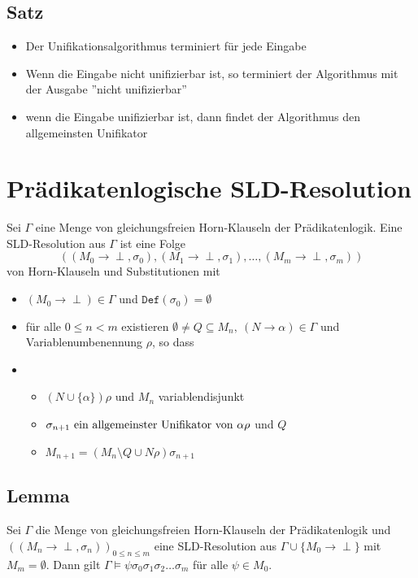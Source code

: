 \documentclass[12pt,a4paper]{report}
\newcommand{\ra}{\rightarrow}
\newcommand{\red}[1]{\textcolor[rgb]{0.9,0.2,0.2}{#1}}
\newcommand{\green}[1]{\textcolor[rgb]{0.1,0.6,0.1}{#1}}
\begin{document}
\subsection{\green{Satz}}
\begin{itemize}
    \item Der Unifikationsalgorithmus terminiert für jede Eingabe
    \item Wenn die Eingabe nicht unifizierbar ist, so terminiert der Algorithmus mit der Ausgabe ''nicht unifizierbar''
    \item wenn die Eingabe unifizierbar ist, dann findet der Algorithmus den allgemeinsten Unifikator
\end{itemize}

\section{\red{Prädikatenlogische SLD-Resolution}}
Sei $ \Gamma $ eine Menge von gleichungsfreien Horn-Klauseln der Prädikatenlogik. Eine \red{SLD-Resolution aus $ \Gamma $} ist eine Folge
\[
    ((M_0 \ra \perp, \sigma_0), (M_1 \ra \perp, \sigma_1),\dots, (M_m \ra \perp, \sigma_m))
\]
von Horn-Klauseln und Substitutionen mit
\begin{itemize}
    \item $ (M_0 \ra \perp) \in \Gamma $ und $ \texttt{Def}(\sigma_0) = \emptyset $
    \item für alle $ 0 \leq n < m $ existieren $ \emptyset \neq Q \subseteq M_n,~ (N \ra \alpha) \in \Gamma $ und Variablenumbenennung $ \rho $, so dass
    \item \begin{itemize}
        \item $ (N \cup \{\alpha\}) \rho $ und $ M_n $ variablendisjunkt
        \item $ \sigma_{n+1} \textnormal{ ein allgemeinster Unifikator von } \alpha \rho $ und $ Q $
        \item $ M_{n+1} = (M_n \setminus Q \cup N \rho) \sigma_{n+1} $
    \end{itemize}
\end{itemize}
\subsection{\green{Lemma}}
Sei $ \Gamma $ die Menge von gleichungsfreien Horn-Klauseln der Prädikatenlogik und $ ((M_n \ra \perp, \sigma_n))_{0 \leq n \leq m} $ eine SLD-Resolution aus $ \Gamma \cup \{M_0 \ra \perp\} $ mit $ M_m = \emptyset $.\newline
Dann gilt $ \Gamma \vDash \psi \sigma_0\sigma_1\sigma_2\dots\sigma_m $ für alle $ \psi \in M_0 $.
\end{document}
